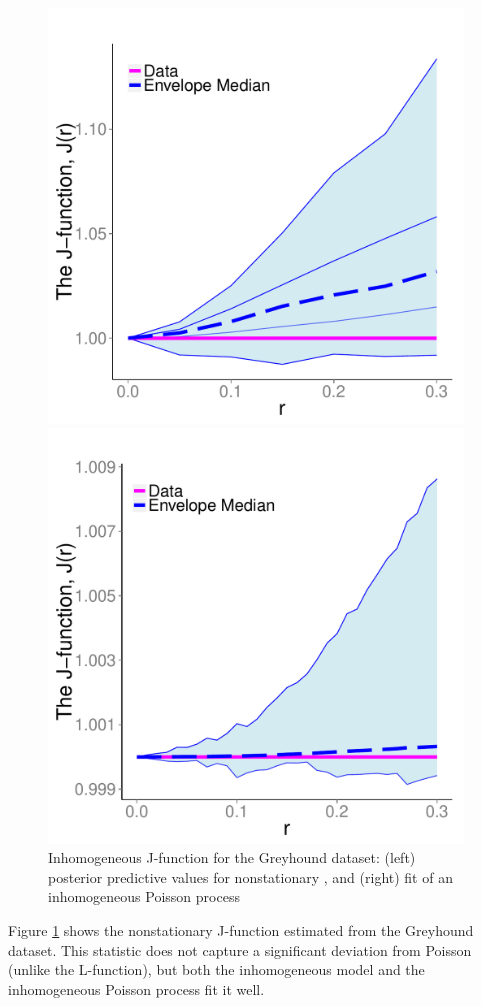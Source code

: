 \documentclass{statsoc}
\begin{document}
  \begin{figure}
  \centering
  \begin{minipage}[h]{0.28\linewidth}
  \caption{Inhomogeneous J-function for the Greyhound dataset: (left) posterior predictive values for nonstationary \matern, and (right)
  fit of an inhomogeneous Poisson process} 
  \label{fig:grey_ncscga_jfunc}
  \end{minipage}
  \begin{minipage}[h]{0.32\linewidth}
    \centering
    \includegraphics[width=0.98\textwidth, angle=0]{figs/greyhound_NCSCGA_matern_J.pdf}
  \end{minipage}
  \begin{minipage}[h]{0.32\linewidth}
  \centering
    \includegraphics[width=0.98\textwidth, angle=0]{figs/greyhound_NCSCGA_poisson_J.pdf}
  \end{minipage}
  \end{figure}

Figure \ref{fig:grey_ncscga_jfunc} shows the nonstationary J-function estimated from the Greyhound dataset. This statistic does not capture
a significant deviation from Poisson (unlike the L-function), but both the inhomogeneous \matern model and the inhomogeneous Poisson process
fit it well.
\end{document}
